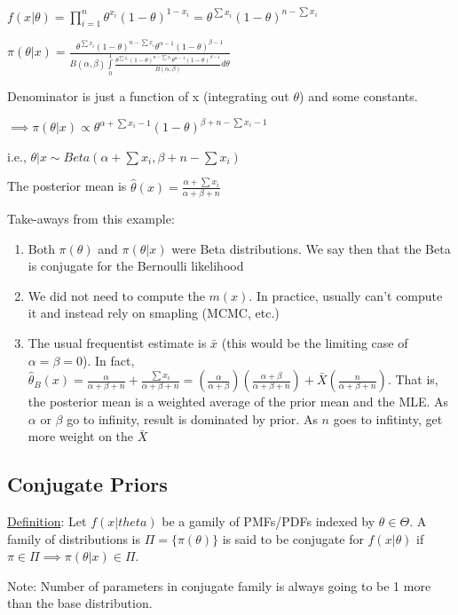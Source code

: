\documentclass{article}
\let\Oldint=\int
\let\Oldsum=\sum
\let\Oldprod=\prod
\renewcommand{\int}{\Oldint\limits}
\renewcommand{\sum}{\Oldsum\limits}
\renewcommand{\prod}{\Oldprod\limits}
\begin{document}
$f(x|\theta) = \prod_{i=1}^n \theta^{x_i}(1-\theta)^{1-x_i} = \theta^{\sum x_i}(1-\theta)^{n-\sum x_i}$

$\pi(\theta|x) = \frac{\theta^{\sum x_i}(1-\theta)^{n-\sum x_i}\theta^{\alpha - 1}(1-\theta)^{\beta - 1}}{B(\alpha, \beta)\int_0^1 \frac{\theta^{\sum x_i}(1-\theta)^{n-\sum x_i}\theta^{\alpha - 1}(1-\theta)^{\beta - 1}}{B(\alpha, \beta)}d\theta}$

Denominator is just a function of x (integrating out $\theta$) and some constants. 

$\implies \pi(\theta|x) \propto \theta^{\alpha + \sum x_i - 1}(1-\theta)^{\beta + n - \sum x_i - 1}$

i.e., $\theta|x \sim Beta(\alpha + \sum x_i, \beta + n - \sum x_i)$

The posterior mean is $\hat{\theta}(x) = \frac{\alpha + \sum x_i}{\alpha + \beta + n}$

Take-aways from this example:
\begin{enumerate}
    \item Both $\pi(\theta)$ and $\pi(\theta|x)$ were Beta distributions. We say then that the Beta is conjugate for the Bernoulli likelihood
    \item We did not need to compute the $m(x)$. In practice, usually can't compute it and instead rely on smapling (MCMC, etc.)
    \item The usual frequentist estimate is $\bar{x}$ (this would be the limiting case of $\alpha = \beta = 0$). In fact, $\hat{\theta}_B(x) = \frac{\alpha}{\alpha + \beta + n} + \frac{\sum x_i}{\alpha + \beta + n}= \left(\frac{\alpha}{\alpha + \beta}\right)\left(\frac{\alpha + \beta}{\alpha + \beta + n}\right) + \bar{X}\left(\frac{n}{\alpha + \beta + n}\right)$. That is, the posterior mean is a weighted average of the prior mean and the MLE. As $\alpha$ or $\beta$ go to infinity, result is dominated by prior. As $n$ goes to infitinty, get more weight on the $\bar{X}$
\end{enumerate}

\subsection{Conjugate Priors}
\underline{Definition}:
Let $f(x|theta)$ be a gamily of PMFs/PDFs indexed by $\theta \in \Theta$. A family of distributions is $\Pi = \{\pi(\theta)\}$ is said to be conjugate for $f(x|\theta)$ if $\pi \in \Pi \implies \pi(\theta|x) \in \Pi$. 

Note: Number of parameters in conjugate family is always going to be 1 more than the base distribution.
\end{document}
